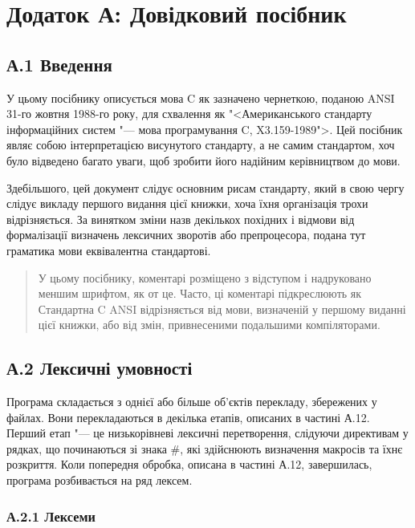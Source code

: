 \documentclass[a4paper,12pt]{book}
\begin{document}
\appendix
\chapter{Додаток А: Довідковий посібник}

\label{f0:A}
\section{А.1 Введення}


  У цьому посібнику описується мова C як зазначено чернеткою, поданою ANSI 31-го жовтня
  1988-го року, для схвалення як "<Американського стандарту інформаційних систем
  "--- мова програмування C, X3.159-1989">. Цей посібник являє собою інтерпретацією
  висунутого стандарту, а не самим стандартом, хоч було відведено багато уваги, щоб
  зробити його надійним керівництвом до мови.

  Здебільшого, цей документ слідує основним рисам стандарту, який в свою чергу слідує
  викладу першого видання цієї книжки, хоча їхня організація трохи відрізняється. За
  винятком зміни назв декількох похідних і відмови від формалізації визначень лексичних
  зворотів або препроцесора, подана тут граматика мови еквівалентна стандартові.

  \begin{quotation}   
  У цьому посібнику, коментарі розміщено з відступом і надруковано меншим шрифтом, як от
  це. Часто, ці коментарі підкреслюють як Стандартна C ANSI відрізняється від мови,
  визначеній у першому виданні цієї книжки, або від змін, привнесеними подальшими
  компіляторами.
  \end{quotation}

\section{А.2 Лексичні умовності}


  Програма складається з однієї або більше об'єктів перекладу, збережених у
  файлах. Вони перекладаються в декілька етапів, описаних в частині А.12. Перший етап "---
  це низькорівневі лексичні перетворення, слідуючи директивам у рядках, що починаються зі
  знака \#, які здійснюють визначення макросів та їхнє розкриття. Коли попередня обробка,
  описана в частині А.12, завершилась, програма розбивається на ряд лексем.

\subsection{А.2.1 Лексеми}
\end{document}
